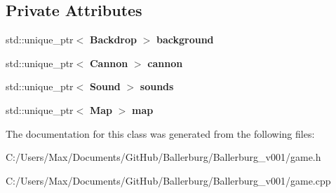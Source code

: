 \subsection*{Private Attributes}
\begin{DoxyCompactItemize}
\item 
std\+::unique\+\_\+ptr$<$ {\bf Backdrop} $>$ {\bfseries background}\label{class_game_a023bc00208cfb619bc770ae70960e324}

\item 
std\+::unique\+\_\+ptr$<$ {\bf Cannon} $>$ {\bfseries cannon}\label{class_game_aac35f37418de999e504f85448b57cb57}

\item 
std\+::unique\+\_\+ptr$<$ {\bf Sound} $>$ {\bfseries sounds}\label{class_game_aca7489006293a79030b68c0e8e4d0029}

\item 
std\+::unique\+\_\+ptr$<$ {\bf Map} $>$ {\bfseries map}\label{class_game_adc3f6b00e354d21502a62e375360911f}

\end{DoxyCompactItemize}


The documentation for this class was generated from the following files\+:\begin{DoxyCompactItemize}
\item 
C\+:/\+Users/\+Max/\+Documents/\+Git\+Hub/\+Ballerburg/\+Ballerburg\+\_\+v001/game.\+h\item 
C\+:/\+Users/\+Max/\+Documents/\+Git\+Hub/\+Ballerburg/\+Ballerburg\+\_\+v001/game.\+cpp\end{DoxyCompactItemize}
